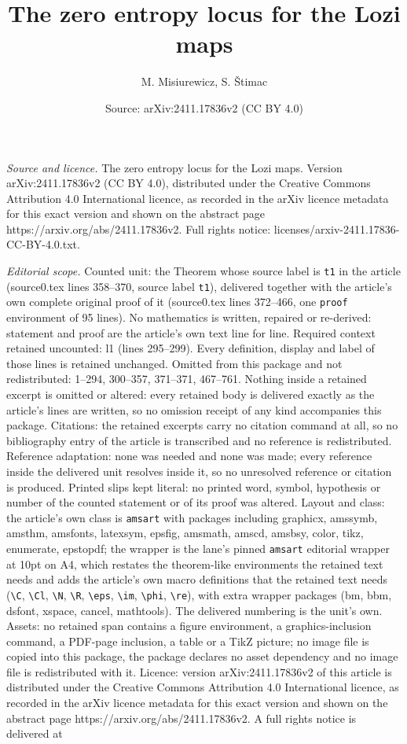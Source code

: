 \documentclass[10pt,a4paper]{amsart}
\title[The zero entropy locus for the Lozi maps]{The zero entropy locus for the Lozi maps}
\author{M. Misiurewicz, S. \v{S}timac}
\date{Source: arXiv:2411.17836v2 (CC BY 4.0)}
\begin{document}
\maketitle

\noindent\emph{Source and licence.} The zero entropy locus for the Lozi maps. Version arXiv:2411.17836v2 (CC BY 4.0), distributed under the Creative Commons Attribution 4.0 International licence, as recorded in the arXiv licence metadata for this exact version and shown on the abstract page https://arxiv.org/abs/2411.17836v2. Full rights notice: licenses/arxiv-2411.17836-CC-BY-4.0.txt.\par\smallskip

\noindent\textit{Editorial scope.} Counted unit: the Theorem whose source label is \texttt{t1} in the article (source0.tex lines 358--370, source label \texttt{t1}), delivered together with the article's own complete original proof of it (source0.tex lines 372--466, one \texttt{proof} environment of 95 lines). No mathematics is written, repaired or re-derived: statement and proof are the article's own text line for line. Required context retained uncounted: l1 (lines 295--299). Every definition, display and label of those lines is retained unchanged. Omitted from this package and not redistributed: 1--294, 300--357, 371--371, 467--761. Nothing inside a retained excerpt is omitted or altered: every retained body is delivered exactly as the article's lines are written, so no omission receipt of any kind accompanies this package. Citations: the retained excerpts carry no citation command at all, so no bibliography entry of the article is transcribed and no reference is redistributed. Reference adaptation: none was needed and none was made; every reference inside the delivered unit resolves inside it, so no unresolved reference or citation is produced. Printed slips kept literal: no printed word, symbol, hypothesis or number of the counted statement or of its proof was altered. Layout and class: the article's own class is \texttt{amsart} with packages including graphicx, amssymb, amsthm, amsfonts, latexsym, epsfig, amsmath, amscd, amsbsy, color, tikz, enumerate, epstopdf; the wrapper is the lane's pinned \texttt{amsart} editorial wrapper at 10pt on A4, which restates the theorem-like environments the retained text needs and adds the article's own macro definitions that the retained text needs (\texttt{\textbackslash C}, \texttt{\textbackslash Cl}, \texttt{\textbackslash N}, \texttt{\textbackslash R}, \texttt{\textbackslash eps}, \texttt{\textbackslash im}, \texttt{\textbackslash phi}, \texttt{\textbackslash re}), with extra wrapper packages (bm, bbm, dsfont, xspace, cancel, mathtools). The delivered numbering is the unit's own. Assets: no retained span contains a figure environment, a graphics-inclusion command, a PDF-page inclusion, a table or a TikZ picture; no image file is copied into this package, the package declares no asset dependency and no image file is redistributed with it. Licence: version arXiv:2411.17836v2 of this article is distributed under the Creative Commons Attribution 4.0 International licence, as recorded in the arXiv licence metadata for this exact version and shown on the abstract page https://arxiv.org/abs/2411.17836v2. A full rights notice is delivered at 
\end{document}
